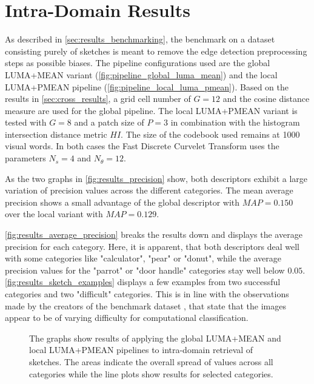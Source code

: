 \section{Intra-Domain Results}\label{sec:intra_results}

As described in \autoref{sec:results_benchmarking}, the benchmark on a dataset
consisting purely of sketches is meant to remove the edge detection
preprocessing steps as possible biases. The pipeline configurations used are
the global LUMA+MEAN variant (\autoref{fig:pipeline_global_luma_mean}) and the
local LUMA+PMEAN pipeline (\autoref{fig:pipeline_local_luma_pmean}). Based on
the results in \autoref{sec:cross_results}, a grid cell number of $G=12$ and
the cosine distance measure are used for the global pipeline. The local
LUMA+PMEAN variant is tested with $G=8$ and a patch size of $P=3$ in
combination with the histogram intersection distance metric $HI$. The size of
the codebook used remains at 1000 visual words. In both cases the Fast Discrete
Curvelet Transform uses the parameters $N_s=4$ and $N_{\theta}=12$.

As the two graphs in \autoref{fig:results_precision} show, both descriptors
exhibit a large variation of precision values across the different categories.
The mean average precision shows a small advantage of the global descriptor
with $MAP=0.150$ over the local variant with $MAP=0.129$.

\autoref{fig:results_average_precision} breaks the results down and displays
the average precision for each category. Here, it is apparent, that both
descriptors deal well with some categories like "calculator", "pear" or "donut",
while the average precision values for the "parrot" or "door handle" categories
stay well below $0.05$. \autoref{fig:results_sketch_examples} displays a few
examples from two successful categories and two "difficult" categories. This is
in line with the observations made by the creators of the benchmark dataset
\autocite{eitz_how_2012}, that state that the images appear to be of varying
difficulty for computational classification. 

\begin{figure}[h]
    \centering
    \quad
    \caption[Precision and Recall Results]{
        The graphs show results of applying the global LUMA+MEAN
         and local LUMA+PMEAN
         pipelines to
        intra-domain retrieval of sketches. The areas indicate the overall
        spread of values across all categories while the line plots show
        results for selected categories.
    }
    \label{fig:results_precision}
\end{figure}

